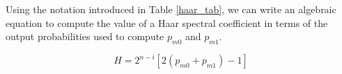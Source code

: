 Using the notation introduced in Table \ref{haar_tab}, we can write an algebraic equation
to compute the value of a Haar spectral coefficient in terms of the output probabilities
used to compute $p_{m0}$ and $p_{m1}$.

\begin{equation}
H = 2^{n-i} [ 2 ( p_{m0} + p_{m1} ) - 1 ] \label{eq:haar_eqn}
\end{equation}

